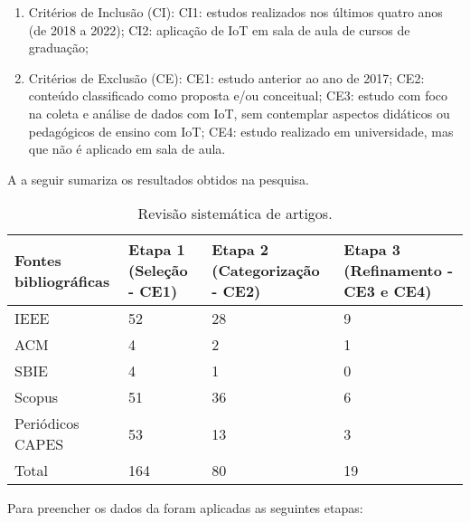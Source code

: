 \documentclass[portuguese]{textolivre}
\begin{document}
\begin{enumerate}[label=\alph*.]
    \item Critérios de Inclusão (CI):
        \subitem CI1: estudos realizados nos últimos quatro anos (de 2018 a 2022);
        \subitem CI2: aplicação de IoT em sala de aula de cursos de graduação;
    \item Critérios de Exclusão (CE):
        \subitem CE1: estudo anterior ao ano de 2017;
        \subitem CE2: conteúdo classificado como proposta e/ou conceitual;
        \subitem CE3: estudo com foco na coleta e análise de dados com IoT, sem contemplar aspectos didáticos ou pedagógicos de ensino com IoT;
        \subitem CE4: estudo realizado em universidade, mas que não é aplicado em sala de aula.
\end{enumerate}

A  a seguir sumariza os resultados obtidos na pesquisa.

\begin{table}[h!]
\centering \small
\begin{threeparttable}
\caption{Revisão sistemática de artigos.}
\label{tab01}
\begin{tabular}{p{3cm} p{3.2cm} p{3.3cm} p{3.3cm}}
\toprule
Fontes bibliográficas & Etapa 1 (Seleção - CE1) & Etapa 2 (Categorização - CE2) & Etapa 3 (Refinamento - CE3 e CE4) \\
 \midrule
IEEE & 52 & 28 & 9 \\
ACM & 4 & 2 & 1 \\
SBIE & 4 & 1 & 0 \\
Scopus & 51 & 36 & 6 \\
Periódicos CAPES & 53 & 13 & 3 \\
Total & 164 & 80 & 19 \\
\bottomrule
\end{tabular}
\end{threeparttable}
\end{table}

Para preencher os dados da  foram aplicadas as seguintes etapas:
\end{document}
